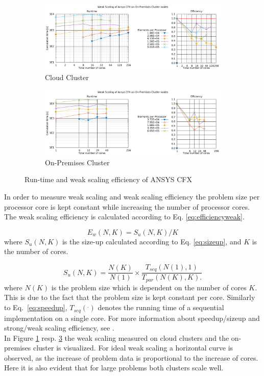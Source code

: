 \documentclass[3p,times]{elsarticle}
\begin{document}
\begin{figure}

	\begin{subfigure}{\linewidth}
		\centering
		\includegraphics[width=.7\linewidth]{gplt-a8-weak-pipe}	
		\caption{Cloud Cluster}
		\label{fig:weakA8}
	\end{subfigure}

	\begin{subfigure}{\linewidth}
		\centering
		\includegraphics[width=.7\linewidth]{gplt-hsr-weak-pipe}
		\caption{On-Premises Cluster}
		\label{fig:weakHSR}
	\end{subfigure}
	
	\caption{Run-time and weak scaling efficiency of ANSYS CFX}

\end{figure}

In order to measure weak scaling and weak scaling efficiency the problem size per processor core is kept constant while increasing the number of processor cores. The weak scaling efficiency is calculated according to Eq. \ref{eq:efficiencyweak}.

\begin{equation}
	\label{eq:efficiencyweak}
	E_w(N,K) = S_u(N,K) / K
\end{equation}
where $S_u(N,K)$ is the size-up calculated according to Eq. \ref{eq:sizeup}, and $K$ is the number of cores.

\begin{equation}
\label{eq:sizeup}
S_u(N,K) = \frac{N(K)}{N(1)} \times \frac{T_{seq}(N(1),1)}{T_{par}(N(K),K).}
\end{equation}
where $N(K)$ is the problem size which is dependent on the number of cores $K$. This is due to the fact that the problem size is kept constant per core. Similarly to Eq.~\ref{eq:speedup}, $T_{seq}(^.)$ denotes the running time of a sequential implementation on a single core. For more information about speedup/sizeup and strong/weak scaling efficiency, see \cite{kaminsky15}.\\
In Figure \ref{fig:weakA8} resp. \ref{fig:weakHSR} the weak scaling measured on cloud clusters and the on-premises cluster is visualized. For ideal weak scaling a horizontal curve is observed, as the increase of problem data is proportional to the increase of cores. Here it is also evident that for large problems both clusters scale well. 
\end{document}
